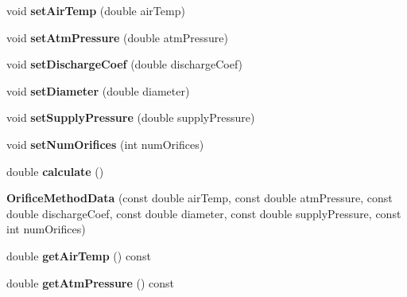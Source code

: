 \begin{DoxyCompactItemize}
void {\bfseries set\+Air\+Temp} (double air\+Temp)
\item 
\mbox{\label{class_orifice_method_data_af6cb7bc9e4576a69fc2e0d5134a15f15}} 
void {\bfseries set\+Atm\+Pressure} (double atm\+Pressure)
\item 
\mbox{\label{class_orifice_method_data_a7165032624c746feebcb1e7cafd90015}} 
void {\bfseries set\+Discharge\+Coef} (double discharge\+Coef)
\item 
\mbox{\label{class_orifice_method_data_a42f7848cba5bc63f76e1ef86b2c13eb5}} 
void {\bfseries set\+Diameter} (double diameter)
\item 
\mbox{\label{class_orifice_method_data_a16a3ab8726b1a83679a8f1517d16a243}} 
void {\bfseries set\+Supply\+Pressure} (double supply\+Pressure)
\item 
\mbox{\label{class_orifice_method_data_a684f185fcd923e6128faa3a442964e64}} 
void {\bfseries set\+Num\+Orifices} (int num\+Orifices)
\item 
\mbox{\label{class_orifice_method_data_a98e7e2a358d23a8f264590c087c6db94}} 
double {\bfseries calculate} ()
\item 
\mbox{\label{class_orifice_method_data_aa1ae1565f565e81e4ac5ffd91c64cfd7}} 
{\bfseries Orifice\+Method\+Data} (const double air\+Temp, const double atm\+Pressure, const double discharge\+Coef, const double diameter, const double supply\+Pressure, const int num\+Orifices)
\item 
\mbox{\label{class_orifice_method_data_ad2264b0df969566c306ac99bb2de20f0}} 
double {\bfseries get\+Air\+Temp} () const
\item 
\mbox{\label{class_orifice_method_data_a71584cfb77a4f56503c58b77f131fea1}} 
double {\bfseries get\+Atm\+Pressure} () const
\item 
\mbox{\label{class_orifice_method_data_a3d55918aab47e9509924a1b5a24757b1}} 

\end{DoxyCompactItemize}
